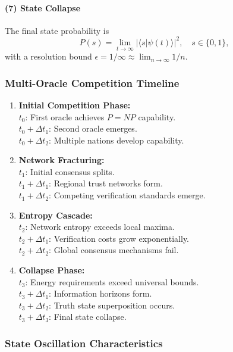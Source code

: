 \documentclass[11pt]{article}
\begin{document}
\paragraph{(7) State Collapse}
The final state probability is
\[
P(s)=\lim_{t\to\infty}|\langle s|\psi(t)\rangle|^2,\quad s\in\{0,1\},
\]
with a resolution bound $\epsilon=1/\infty\approx \lim_{n\to\infty}1/n$.

\subsubsection{Multi-Oracle Competition Timeline}

\begin{enumerate}[label=(\arabic*)]
    \item \textbf{Initial Competition Phase:} \\
    \quad $t_0$: First oracle achieves $P=NP$ capability.\\
    \quad $t_0+\Delta t_1$: Second oracle emerges.\\
    \quad $t_0+\Delta t_2$: Multiple nations develop capability.
    \item \textbf{Network Fracturing:} \\
    \quad $t_1$: Initial consensus splits.\\
    \quad $t_1+\Delta t_1$: Regional trust networks form.\\
    \quad $t_1+\Delta t_2$: Competing verification standards emerge.
    \item \textbf{Entropy Cascade:} \\
    \quad $t_2$: Network entropy exceeds local maxima.\\
    \quad $t_2+\Delta t_1$: Verification costs grow exponentially.\\
    \quad $t_2+\Delta t_2$: Global consensus mechanisms fail.
    \item \textbf{Collapse Phase:} \\
    \quad $t_3$: Energy requirements exceed universal bounds.\\
    \quad $t_3+\Delta t_1$: Information horizons form.\\
    \quad $t_3+\Delta t_2$: Truth state superposition occurs.\\
    \quad $t_3+\Delta t_3$: Final state collapse.
\end{enumerate}

\subsubsection{State Oscillation Characteristics}
\end{document}
